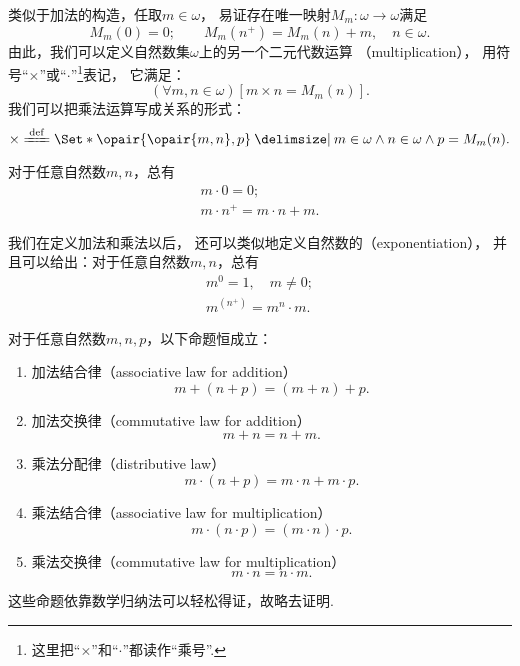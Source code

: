 类似于加法的构造，任取\(m \in \omega\)，
易证存在唯一映射\(M_m\colon \omega \to \omega\)满足\[
	M_m(0) = 0; \qquad
	M_m(n^+) = M_m(n) + m, \quad n \in \omega.
\]
由此，我们可以定义自然数集\(\omega\)上的另一个二元代数运算%
（multiplication），
用符号“\(\times\)”或“\(\cdot\)”\footnote{%
这里把“\(\times\)”和“\(\cdot\)”都读作“乘号”.
}表记，
它满足：\[
	(\forall m,n\in\omega)[m \times n = M_m(n)].
\]
我们可以把乘法运算写成关系的形式：\[
	\times \defeq \Set*{
		\opair{\opair{m,n},p}
		\given
		m \in \omega
		\land
		n \in \omega
		\land
		p = M_m(n)
	}.
\]

\begin{theorem}
对于任意自然数\(m,n\)，总有\begin{gather}
	m \cdot 0 = 0;
	\label{equation:集合论.自然数的乘法.性质1} \\%
	m \cdot n^+ = m \cdot n + m.
	\label{equation:集合论.自然数的乘法.性质2}%
\end{gather}
\end{theorem}

我们在定义加法和乘法以后，
还可以类似地定义自然数的（exponentiation），
并且可以给出：对于任意自然数\(m,n\)，总有\begin{gather}
	m^0 = 1, \quad m \neq 0;
	\label{equation:集合论.自然数的乘幂.性质1} \\%
	m^{(n^+)} = m^n \cdot m.
	\label{equation:集合论.自然数的乘幂.性质2}%
\end{gather}

\begin{theorem}
对于任意自然数\(m,n,p\)，以下命题恒成立：
\begin{enumerate}
	\item 加法结合律（associative law for addition）
	\begin{equation}\label{equation:集合论.自然数加法结合律}
		m+(n+p)=(m+n)+p.
	\end{equation}
	\item 加法交换律（commutative law for addition）
	\begin{equation}\label{equation:集合论.自然数加法交换律}
		m+n=n+m.
	\end{equation}
	\item 乘法分配律（distributive law）
	\begin{equation}\label{equation:集合论.自然数乘法分配律}
		m \cdot (n+p) = m \cdot n + m \cdot p.
	\end{equation}
	\item 乘法结合律（associative law for multiplication）
	\begin{equation}\label{equation:集合论.自然数乘法结合律}
		m \cdot (n \cdot p) = (m \cdot n) \cdot p.
	\end{equation}
	\item 乘法交换律（commutative law for multiplication）
	\begin{equation}\label{equation:集合论.自然数乘法交换律}
		m \cdot n = n \cdot m.
	\end{equation}
\end{enumerate}
\end{theorem}
这些命题依靠数学归纳法可以轻松得证，故略去证明.

